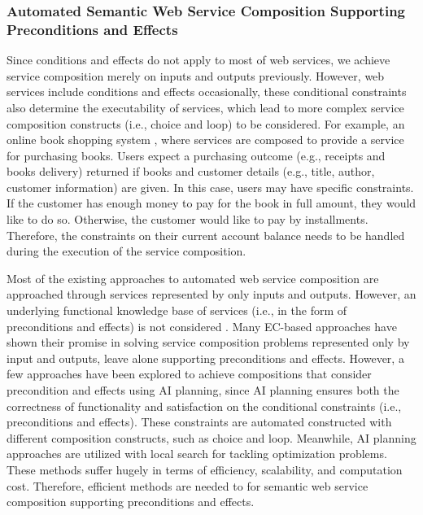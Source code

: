 \subsubsection{Automated Semantic Web Service Composition Supporting Preconditions and Effects}

Since conditions and effects do not apply to most of web services, we achieve service composition merely on inputs and outputs previously. However, web services include conditions and effects occasionally, these conditional constraints also determine the executability of services, which lead to more complex service composition constructs (i.e., choice and loop) to be considered. For example, an online book shopping system \cite{wang2014automated}, where services are composed to provide a service for purchasing books. Users expect a purchasing outcome (e.g., receipts and books delivery) returned if books and customer details (e.g., title, author, customer information) are given. In this case, users may have specific constraints. If the customer has enough money to pay for the book in full amount, they would like to do so. Otherwise, the customer would like to pay by installments. Therefore, the constraints on their current account balance needs to be handled during the execution of the service composition.

Most of the existing approaches to automated web service composition are approached through services represented by only inputs and outputs. However, an underlying functional knowledge base of services (i.e., in the form of preconditions and effects) is not considered \cite{paliwal2012semantics}. Many EC-based approaches have shown their promise in solving service composition problems represented only by input and outputs, leave alone supporting preconditions and effects. However, a few approaches \cite{bansal2016generalized,DBLP:journals/soca/BoustilMS14} have been explored to achieve compositions that consider precondition and effects using AI planning, since AI planning ensures both the correctness of functionality and satisfaction on the conditional constraints (i.e., preconditions and effects). These constraints are automated constructed with different composition constructs, such as choice and loop. Meanwhile, AI planning approaches are utilized with local search for tackling optimization problems. These methods suffer hugely in terms of efficiency, scalability, and computation cost. Therefore, efficient methods are needed to for semantic web service composition supporting preconditions and effects.


